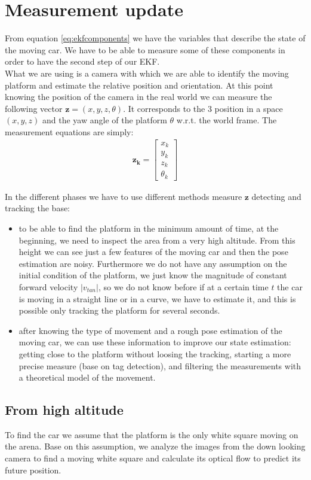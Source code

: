 \section{Measurement update}
From equation \ref{eq:ekfcomponents} we have the variables that describe the state of the moving car. We have to be able to measure some of these components in order to have the second step of our EKF. \\
What we are using is a camera with which we are able to identify the moving platform and estimate the relative position and orientation. At this point knowing the position of the camera in the real world we can measure the following vector $\boldsymbol{z} = (x, y, z,\theta)$. It corresponds to the 3 position in a space $(x,y,z)$ and the yaw angle of the platform $\theta$ w.r.t. the world frame.
The measurement equations are simply:
\begin{align}
\boldsymbol{z_k} = 
\begin{bmatrix}
x_k  \\[10pt]
y_k  \\[10pt]
z_k \\[10pt]
\theta_k
\end{bmatrix}
\label{eq:realmeasure}
\end{align}

In the different phases we have to use different methods measure  $\boldsymbol{z}$ detecting and tracking the base:
\begin{itemize}
\item to be able to find the platform in the minimum amount of time, at the beginning, we need to inspect the area from a very high altitude. From this height we can see just a few features of the moving car and then the pose estimation are noisy. Furthermore we do not have any assumption on the initial condition of the platform, we just know the magnitude of constant forward velocity $|v_{tan}|$, so we do not know before if at a certain time $t$ the car is moving in a straight line or in a curve, we have to estimate it, and this is possible only tracking the platform for several seconds. 
\item after knowing the type of movement and a rough pose estimation of the moving car, we can use these information to improve our state estimation: getting close to the platform without loosing the tracking, starting a more precise measure (base on tag detection), and filtering the measurements with a theoretical model of the movement.
\end{itemize}
\subsection{From high altitude}
To find the car we assume that the platform is the only white square moving on the arena.
Base on this assumption, we analyze the images from the down looking camera to find a moving white square and calculate its optical flow to predict its future position.

